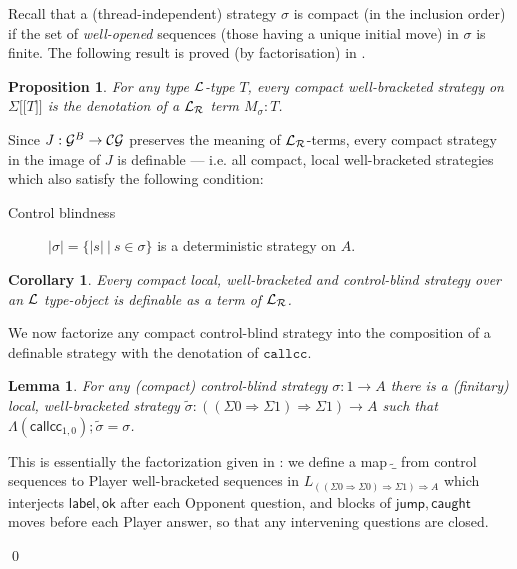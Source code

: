 \documentclass{eptcs}
\def\[{\ensuremath{[ \! [}}
\def\]{\ensuremath{] \! ]}}
\def\G{{\cal{G}}}
\def\L{{\cal{L}}}
\def\0{0}
\def\1m{\iota}
\def\1{1}
\newcommand{\CG}{{\cal{CG}}}
\newcommand{\lbl}{{\mathsf{label}}}
\newcommand{\jump}{{\mathsf{jump}}}
\newcommand{\ok}{{\mathsf{ok}}}
\newcommand{\caught}{{\mathsf{caught}}}
\newcommand{\callcc}{{\mathtt{callcc}}}
\newcommand{\Lr}{{\cal{L_R}}}
\newcommand{\callc}{{\mathsf{callcc}}}
\newtheorem{lemma}[theorem]{Lemma}
\newtheorem{proposition}[theorem]{Proposition}
\newtheorem{corollary}[theorem]{Corollary}
\newif\ifqed
\newcommand{\qed}{\global\qedfalse\noindent\unskip\penalty50\null\nobreak\hskip1em\nobreak\hfill$\Box$}
\let\Box\undefined
\newenvironment{proof}[1][Proof]{\global\qedtrue\trivlist\item[\hskip\labelsep\textsc{#1:}]}{\ifqed\qed\fi\endtrivlist}
\begin{document}
{Recall that a (thread-independent) strategy $\sigma$ is compact (in the inclusion order) if the set of \emph{well-opened} sequences (those having a unique initial  move) in $\sigma$ is finite. The following result is proved (by factorisation) in \cite{AHM}.
\begin{proposition}For any type $\L$-type $T$, every compact well-bracketed strategy on $\Sigma\[T\]$ is the denotation of a $\Lr$ term $M_\sigma:T$.
\end{proposition}
Since $J:\G^B \rightarrow \CG$ preserves the meaning of $\Lr$-terms, every compact strategy in the image of $J$ is definable --- i.e. all compact, local well-bracketed strategies which also satisfy the following condition:
\begin{description}
\item [Control blindness]$|\sigma| = \{|s|\ |\ s \in \sigma\}$ is a deterministic strategy on $A$.
\end{description}
\begin{corollary}\label{ldef}Every  compact local, well-bracketed and  control-blind  strategy over an $\L$ type-object is definable as a term of $\Lr$. 
\end{corollary}
We now factorize any compact control-blind strategy into the composition of a definable strategy with the denotation of $\callcc$. 
\begin{lemma}For any (compact) control-blind strategy  $\sigma:\1 \rightarrow A$ there is a (finitary) local, well-bracketed  strategy $\widetilde{\sigma}: ((\Sigma\0 \Rightarrow \Sigma\1) \Rightarrow \Sigma\1) \rightarrow A$ such that  $\Lambda(\callc_{1,0});\widetilde{\sigma} = \sigma$.
\end{lemma}
\begin{proof}This is essentially the factorization given in \cite{L}: we define a map $\widetilde{\_}$ from control sequences to Player well-bracketed sequences in $L_{((\Sigma\0 \Rightarrow \Sigma\0)  \Rightarrow \Sigma\1)  \Rightarrow A}$ which interjects $\lbl,\ok$ after each Opponent question, and blocks of $\jump,\caught$ moves before each Player answer, so that  any intervening questions are closed.







\end{proof}}
\end{document}
